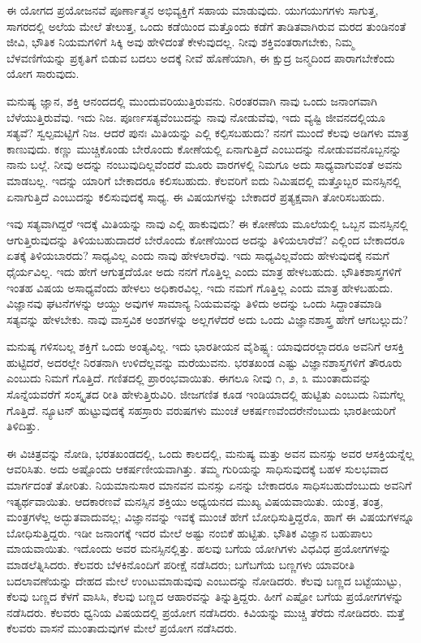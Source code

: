 ಈ ಯೋಗದ ಪ್ರಯೋಜನವೆ ಪೂರ್ಣಾತ್ಮನ ಅಭಿವ್ಯಕ್ತಿಗೆ ಸಹಾಯ ಮಾಡುವುದು. ಯುಗಯುಗಗಳು ಸಾಗುತ್ತ, ಸಾಗರದಲ್ಲಿ ಅಲೆಯ ಮೇಲೆ ತೇಲುತ್ತ, ಒಂದು ಕಡೆಯಿಂದ ಮತ್ತೊಂದು ಕಡೆಗೆ ತಾಡಿತವಾಗಿರುವ ಮರದ ತುಂಡಿನಂತೆ ಜೀವಿ, ಭೌತಿಕ ನಿಯಮಗಳಿಗೆ ಸಿಕ್ಕಿ ಅವು ಹೇಳಿದಂತೆ ಕೇಳುವುದಲ್ಲ. ನೀವು ಶಕ್ತಿವಂತರಾಗಬೇಕು, ನಿಮ್ಮ ಬೆಳವಣಿಗೆಯನ್ನು ಪ್ರಕೃತಿಗೆ ಬಿಡುವ ಬದಲು ಅದಕ್ಕೆ ನೀವೆ ಹೊಣೆಯಾಗಿ, ಈ ಕ್ಷುದ್ರ ಜನ್ಮದಿಂದ ಪಾರಾಗಬೇಕೆಂದು ಯೋಗ ಸಾರುವುದು.

ಮನುಷ್ಯ ಜ್ಞಾನ, ಶಕ್ತಿ ಆನಂದದಲ್ಲಿ ಮುಂದುವರಿಯುತ್ತಿರುವನು. ನಿರಂತರವಾಗಿ ನಾವು ಒಂದು ಜನಾಂಗವಾಗಿ ಬೆಳೆಯುತ್ತಿರುವೆವು. ಇದು ನಿಜ. ಪೂರ್ಣಸತ್ಯವೆಂಬುದನ್ನು ನಾವು ನೋಡುವೆವು, ಇದು ವ್ಯಷ್ಟಿ ಜೀವನದಲ್ಲಿಯೂ ಸತ್ಯವೆ? ಸ್ವಲ್ಪಮಟ್ಟಿಗೆ ನಿಜ. ಆದರೆ ಪುನಃ ಮಿತಿಯನ್ನು ಎಲ್ಲಿ ಕಲ್ಪಿಸಬಹುದು? ನನಗೆ ಮುಂದೆ ಕೆಲವು ಅಡಿಗಳು ಮಾತ್ರ ಕಾಣುವುದು. ಕಣ್ಣು ಮುಚ್ಚಿಕೊಂಡು ಬೇರೊಂದು ಕೋಣೆಯಲ್ಲಿ ಏನಾಗುತ್ತಿದೆ ಎಂಬುದನ್ನು ನೋಡುವವನೊಬ್ಬನನ್ನು ನಾನು ಬಲ್ಲೆ. ನೀವು ಅದನ್ನು ನಂಬುವುದಿಲ್ಲವೆಂದರೆ ಮೂರು ವಾರಗಳಲ್ಲಿ ನಿಮಗೂ ಅದು ಸಾಧ್ಯವಾಗುವಂತೆ ಅವನು ಮಾಡಬಲ್ಲ. ಇದನ್ನು ಯಾರಿಗೆ ಬೇಕಾದರೂ ಕಲಿಸಬಹುದು. ಕೆಲವರಿಗೆ ಐದು ನಿಮಿಷದಲ್ಲಿ ಮತ್ತೊಬ್ಬರ ಮನಸ್ಸಿನಲ್ಲಿ ಏನಾಗುತ್ತಿದೆ ಎಂಬುದನ್ನು ಕಲಿಸುವುದಕ್ಕೆ ಸಾಧ್ಯ. ಈ ವಿಷಯಗಳನ್ನು ಬೇಕಾದರೆ ಪ್ರತ್ಯಕ್ಷವಾಗಿ ತೋರಿಸಬಹುದು.

ಇವು ಸತ್ಯವಾಗಿದ್ದರೆ ಇದಕ್ಕೆ ಮಿತಿಯನ್ನು ನಾವು ಎಲ್ಲಿ ಹಾಕುವುದು? ಈ ಕೋಣೆಯ ಮೂಲೆಯಲ್ಲಿ ಒಬ್ಬನ ಮನಸ್ಸಿನಲ್ಲಿ ಆಗುತ್ತಿರುವುದನ್ನು ತಿಳಿಯಬಹುದಾದರೆ ಬೇರೊಂದು ಕೋಣೆಯಿಂದ ಅದನ್ನು ತಿಳಿಯಲಾರೆವೆ? ಎಲ್ಲಿಂದ ಬೇಕಾದರೂ ಏತಕ್ಕೆ ತಿಳಿಯಬಾರದು? ಸಾಧ್ಯವಿಲ್ಲ ಎಂದು ನಾವು ಹೇಳಲಾರೆವು. ಇದು ಸಾಧ್ಯವಿಲ್ಲವೆಂದು ಹೇಳುವುದಕ್ಕೆ ನಮಗೆ ಧೈರ್ಯವಿಲ್ಲ. ಇದು ಹೇಗೆ ಆಗುತ್ತದೆಯೋ ಅದು ನನಗೆ ಗೊತ್ತಿಲ್ಲ ಎಂದು ಮಾತ್ರ ಹೇಳಬಹುದು. ಭೌತಿಕಶಾಸ್ತ್ರಗಳಿಗೆ ಇಂತಹ ವಿಷಯ ಅಸಾಧ್ಯವೆಂದು ಹೇಳಲು ಅಧಿಕಾರವಿಲ್ಲ. ಇದು ನಮಗೆ ಗೊತ್ತಿಲ್ಲ ಎಂದು ಮಾತ್ರ ಹೇಳಬಹುದು. ವಿಜ್ಞಾನವು ಘಟನೆಗಳನ್ನು ಆಯ್ದು ಅವುಗಳ ಸಾಮಾನ್ಯ ನಿಯಮವನ್ನು ತಿಳಿದು ಅದನ್ನು ಒಂದು ಸಿದ್ದಾಂತಮಾಡಿ ಸತ್ಯವನ್ನು ಹೇಳಬೇಕು. ನಾವು ವಾಸ್ತವಿಕ ಅಂಶಗಳನ್ನು ಅಲ್ಲಗಳೆದರೆ ಅದು ಒಂದು ವಿಜ್ಞಾನಶಾಸ್ತ್ರ ಹೇಗೆ ಆಗಬಲ್ಲುದು?

ಮನುಷ್ಯ ಗಳಿಸಬಲ್ಲ ಶಕ್ತಿಗೆ ಒಂದು ಅಂತ್ಯವಿಲ್ಲ. ಇದು ಭಾರತೀಯನ ವೈಶಿಷ್ಟ್ಯ: ಯಾವುದರಲ್ಲಾದರೂ ಅವನಿಗೆ ಆಸಕ್ತಿ ಹುಟ್ಟಿದರೆ, ಅದರಲ್ಲೇ ನಿರತನಾಗಿ ಉಳಿದೆಲ್ಲವನ್ನು ಮರೆಯುವನು. ಭರತಖಂಡ ಎಷ್ಟು ವಿಜ್ಞಾನಶಾಸ್ತ್ರಗಳಿಗೆ ತೌರೂರು ಎಂಬುದು ನಿಮಗೆ ಗೊತ್ತಿದೆ. ಗಣಿತದಲ್ಲಿ ಪ್ರಾರಂಭವಾಯಿತು. ಈಗಲೂ ನೀವು ೧, ೨, ೩ ಮುಂತಾದುವನ್ನು ಸೊನ್ನೆಯವರೆಗೆ ಸಂಸ್ಕೃತದ ರೀತಿ ಹೇಳುತ್ತಿರುವಿರಿ. ಜೀಜಗಣಿತ ಕೂಡ ಇಂಡಿಯಾದಲ್ಲಿ ಹುಟ್ಟಿತು ಎಂಬುದು ನಿಮಗೆಲ್ಲ ಗೊತ್ತಿದೆ. ನ್ಯೂಟನ್ ಹುಟ್ಟುವುದಕ್ಕೆ ಸಹಸ್ರಾರು ವರುಷಗಳು ಮುಂಚೆ ಆಕರ್ಷಣವೆಂದರೇನೆಂಬುದು ಭಾರತೀಯರಿಗೆ ತಿಳಿದಿತ್ತು.

ಈ ವಿಚಿತ್ರವನ್ನು ನೋಡಿ, ಭರತಖಂಡದಲ್ಲಿ, ಒಂದು ಕಾಲದಲ್ಲಿ, ಮನುಷ್ಯ ಮತ್ತು ಅವನ ಮನಸ್ಸು ಅವರ ಆಸಕ್ತಿಯನ್ನೆಲ್ಲ ಆವರಿಸಿತು. ಅದು ಅಷ್ಟೊಂದು ಆಕರ್ಷಣೀಯವಾಗಿತ್ತು. ತಮ್ಮ ಗುರಿಯನ್ನು ಸಾಧಿಸುವುದಕ್ಕೆ ಬಹಳ ಸುಲಭವಾದ ಮಾರ್ಗದಂತೆ ತೋರಿತು. ನಿಯಮಾನುಸಾರ ಮಾನವನ ಮನಸ್ಸು ಏನನ್ನು ಬೇಕಾದರೂ ಸಾಧಿಸಬಹುದೆಂಬುದು ಅವನಿಗೆ ಇತ್ಯರ್ಥವಾಯಿತು. ಆದಕಾರಣವೆ ಮನಸ್ಸಿನ ಶಕ್ತಿಯು ಅಧ್ಯಯನದ ಮುಖ್ಯ ವಿಷಯವಾಯಿತು. ಯಂತ್ರ, ತಂತ್ರ, ಮಂತ್ರಗಳೆಲ್ಲ ಅದ್ಭುತವಾದುವಲ್ಲ; ವಿಜ್ಞಾನವನ್ನು ಇವಕ್ಕೆ ಮುಂಚೆ ಹೇಗೆ ಬೋಧಿಸುತ್ತಿದ್ದರೊ, ಹಾಗೆ ಈ ವಿಷಯಗಳನ್ನೂ ಬೋಧಿಸುತ್ತಿದ್ದರು. ಇಡೀ ಜನಾಂಗಕ್ಕೆ ಇದರ ಮೇಲೆ ಅಷ್ಟು ನಂಬಿಕೆ ಹುಟ್ಟಿತು. ಭೌತಿಕ ವಿಜ್ಞಾನ ಬಹುಪಾಲು ಮಾಯವಾಯಿತು. ಇದೊಂದು ಅವರ ಮನಸ್ಸಿನಲ್ಲಿತ್ತು. ಹಲವು ಬಗೆಯ ಯೋಗಿಗಳು ವಿಧವಿಧ ಪ್ರಯೋಗಗಳನ್ನು ಮಾಡಲೆತ್ನಿಸಿದರು. ಕೆಲವರು ಬೆಳಕಿನೊಂದಿಗೆ ಪರೀಕ್ಷೆ ನಡೆಸಿದರು; ಬಗೆಬಗೆಯ ಬಣ್ಣಗಳು ಯಾವರೀತಿ ಬದಲಾವಣೆಯನ್ನು ದೇಹದ ಮೇಲೆ ಉಂಟುಮಾಡುವುವು ಎಂಬುದನ್ನು ನೋಡಿದರು. ಕೆಲವು ಬಣ್ಣದ ಬಟ್ಟೆಯುಟ್ಟು, ಕೆಲವು ಬಣ್ಣದ ಕೆಳಗೆ ವಾಸಿಸಿ, ಕೆಲವು ಬಣ್ಣದ ಆಹಾರವನ್ನು ತಿನ್ನುತ್ತಿದ್ದರು. ಹೀಗೆ ಎಷ್ಟೋ ಬಗೆಯ ಪ್ರಯೋಗಗಳನ್ನು ನಡೆಸಿದರು. ಕೆಲವರು ಧ್ವನಿಯ ವಿಷಯದಲ್ಲಿ ಪ್ರಯೋಗ ನಡೆಸಿದರು. ಕಿವಿಯನ್ನು ಮುಚ್ಚಿ ತೆರೆದು ನೋಡಿದರು. ಮತ್ತೆ ಕೆಲವರು ವಾಸನೆ ಮುಂತಾದುವುಗಳ ಮೇಲೆ ಪ್ರಯೋಗ ನಡೆಸಿದರು.

